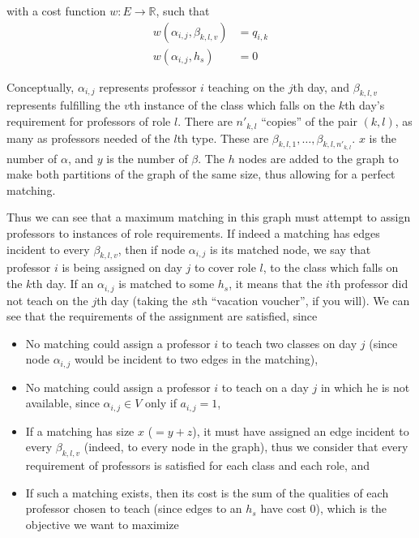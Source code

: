 with a cost function $w: E \to \mathbb{R}$, such that
\begin{align*}
w(\alpha_{i, j}, \beta_{k, l, v}) &= q_{i, k}\\
w(\alpha_{i, j}, h_s) &= 0
\end{align*}

Conceptually, $\alpha_{i, j}$ represents professor $i$ teaching on the $j$th day, and $\beta_{k, l, v}$ represents fulfilling the $v$th instance of the class which falls on the $k$th day's requirement for professors of role $l$. There are $n'_{k, l}$ ``copies'' of the pair $(k, l)$, as many as professors needed of the $l$th type. These are $\beta_{k, l, 1}, \dots, \beta_{k, l, n'_{k, l}}$. $x$ is the number of $\alpha$, and $y$ is the number of $\beta$. The $h$ nodes are added to the graph to make both partitions of the graph of the same size, thus allowing for a perfect matching.

Thus we can see that a maximum matching in this graph must attempt to assign professors to instances of role requirements. If indeed a matching has edges incident to every $\beta_{k, l, v}$, then if node $\alpha_{i, j}$ is its matched node, we say that professor $i$ is being assigned on day $j$ to cover role $l$, to the class which falls on the $k$th day. If an $\alpha_{i, j}$ is matched to some $h_s$, it means that the $i$th professor did not teach on the $j$th day (taking the $s$th ``vacation voucher'', if you will). We can see that the requirements of the assignment are satisfied, since

\begin{itemize}
\item No matching could assign a professor $i$ to teach two classes on day $j$ (since node $\alpha_{i, j}$ would be incident to two edges in the matching),
\item No matching could assign a professor $i$ to teach on a day $j$ in which he is not available, since $\alpha_{i, j} \in V$ only if $a_{i, j} = 1$,
\item If a matching has size $x$ ($= y + z$), it must have assigned an edge incident to every $\beta_{k, l, v}$ (indeed, to every node in the graph), thus we consider that every requirement of professors is satisfied for each class and each role, and
\item If such a matching exists, then its cost is the sum of the qualities of each professor chosen to teach (since edges to an $h_s$ have cost 0), which is the objective we want to maximize
\end{itemize}

